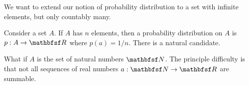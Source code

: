 
\sbasic


























\sstart
\stitle{}


We want to extend our notion
of probability distribution to
a set with infinite elements,
but only countably many.


Consider a set $A$. If $A$
has $n$ elements, then a probability
distribution on $A$ is $p: A \to \R$
where $p(a) = 1/n$. There is a natural
candidate.

What if $A$ is the set of natural numbers $\N$.
The principle difficulty is that not all sequences
of real numbers $a: \N \to \R$ are summable.
\strats
